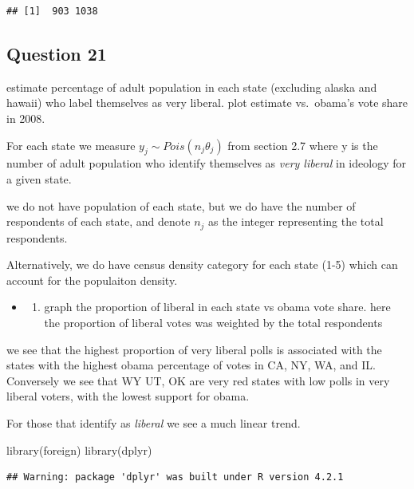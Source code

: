 \documentclass[
]{book}
\newenvironment{Shaded}{\begin{snugshade}}{\end{snugshade}}
\newcommand{\FunctionTok}[1]{\textcolor[rgb]{0.00,0.00,0.00}{#1}}
\newcommand{\NormalTok}[1]{#1}
\providecommand{\tightlist}{%
  \setlength{\itemsep}{0pt}\setlength{\parskip}{0pt}}
\theoremstyle{definition}
\theoremstyle{definition}
\theoremstyle{definition}
\theoremstyle{definition}
\theoremstyle{remark}
\begin{document}
\begin{verbatim}
## [1]  903 1038
\end{verbatim}

\hypertarget{question-21}{%
\subsection{Question 21}\label{question-21}}

estimate percentage of adult population in each state (excluding alaska and hawaii) who label themselves as very liberal. plot estimate vs.~obama's vote share in 2008.

For each state we measure \(y_j\sim Pois(n_j\theta_j)\) from section 2.7 where y is the number of adult population who identify themselves as \emph{very liberal} in ideology for a given state.

we do not have population of each state, but we do have the number of respondents of each state, and denote \(n_j\) as the integer representing the total respondents.

Alternatively, we do have census density category for each state (1-5) which can account for the populaiton density.

\begin{itemize}
\item
  \begin{enumerate}
  \def\labelenumi{(\alph{enumi})}
  \tightlist
  \item
    graph the proportion of liberal in each state vs obama vote share. here the proportion of liberal votes was weighted by the total respondents
  \end{enumerate}
\end{itemize}

we see that the highest proportion of very liberal polls is associated with the states with the highest obama percentage of votes in CA, NY, WA, and IL. Conversely we see that WY UT, OK are very red states with low polls in very liberal voters, with the lowest support for obama.

For those that identify as \emph{liberal} we see a much linear trend.

\begin{Shaded}
\begin{Highlighting}[]
 \FunctionTok{library}\NormalTok{(foreign)}
 \FunctionTok{library}\NormalTok{(dplyr)}
\end{Highlighting}
\end{Shaded}

\begin{verbatim}
## Warning: package 'dplyr' was built under R version 4.2.1
\end{verbatim}
\end{document}
